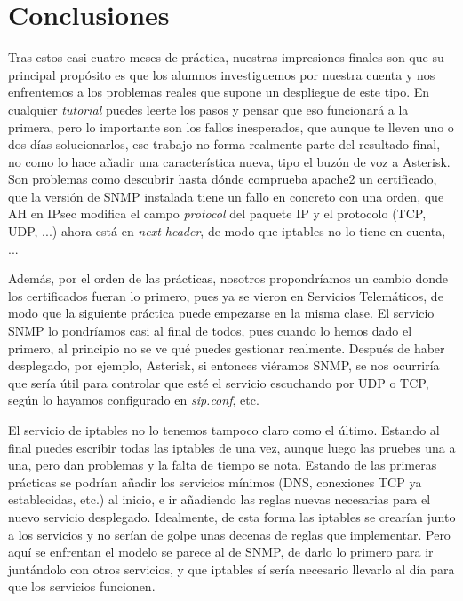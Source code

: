\documentclass[]{article}
\begin{document}
\section{Conclusiones}

Tras estos casi cuatro meses de práctica, nuestras impresiones finales son que su principal propósito es que los alumnos investiguemos por nuestra cuenta y nos enfrentemos a los problemas reales que supone un despliegue de este tipo. En cualquier \textit{tutorial} puedes leerte los pasos y pensar que eso funcionará a la primera, pero lo importante son los fallos inesperados, que aunque te lleven uno o dos días solucionarlos, ese trabajo no forma realmente parte del resultado final, no como lo hace añadir una característica nueva, tipo el buzón de voz a Asterisk. Son problemas como descubrir hasta dónde comprueba apache2 un certificado, que la versión de SNMP instalada tiene un fallo en concreto con una orden, que AH en IPsec modifica el campo \textit{protocol} del paquete IP y el protocolo (TCP, UDP, ...) ahora está en \textit{next header}, de modo que iptables no lo tiene en cuenta, ...
               
               
               
Además, por el orden de las prácticas, nosotros propondríamos un cambio donde los certificados fueran lo primero, pues ya se vieron en Servicios Telemáticos, de modo que la siguiente práctica puede empezarse en la misma clase. El servicio SNMP lo pondríamos casi al final de todos, pues cuando lo hemos dado el primero, al principio no se ve qué puedes gestionar realmente. Después de haber desplegado, por ejemplo, Asterisk, si entonces viéramos SNMP, se nos ocurriría que sería útil para controlar que esté el servicio escuchando por UDP o TCP, según lo hayamos configurado en \textit{sip.conf}, etc.

El servicio de iptables no lo tenemos tampoco claro como el último. Estando al final puedes escribir todas las iptables de una vez, aunque luego las pruebes una a una, pero dan problemas y la falta de tiempo se nota. Estando de las primeras prácticas se podrían añadir los servicios mínimos (DNS, conexiones TCP ya establecidas, etc.) al inicio, e ir añadiendo las reglas nuevas necesarias para el nuevo servicio desplegado. Idealmente, de esta forma las iptables se crearían junto a los servicios y no serían de golpe unas decenas de reglas que implementar. Pero aquí se enfrentan el modelo se parece al de SNMP, de darlo lo primero para ir juntándolo con otros servicios, y que iptables sí sería necesario llevarlo al día para que los servicios funcionen.
\end{document}
